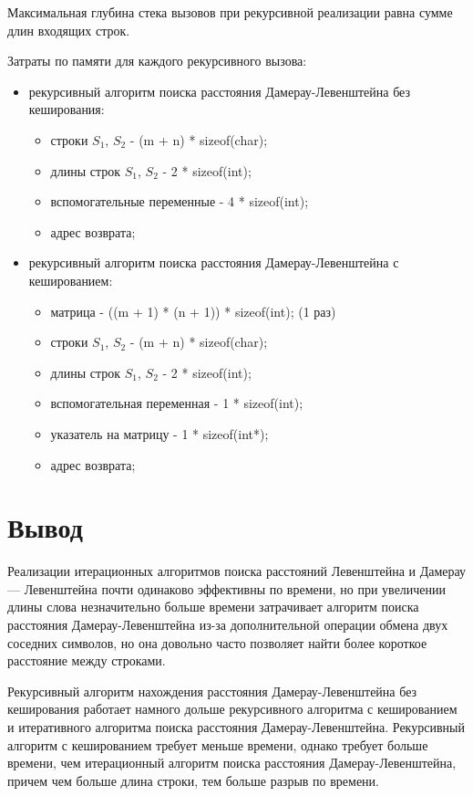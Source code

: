 Максимальная глубина стека вызовов при рекурсивной реализации равна сумме длин входящих строк.

Затраты по памяти для каждого рекурсивного вызова:
\begin{itemize}
	\item рекурсивный алгоритм поиска расстояния Дамерау-Левенштейна без кеширования:\begin{itemize}
		\item строки $S_1$, $S_2$ - (m + n) * sizeof(char);
		\item длины строк $S_1$, $S_2$ - 2 * sizeof(int);
		\item вспомогательные переменные -  4 * sizeof(int);
		\item адрес возврата;
	\end{itemize}
	\item рекурсивный алгоритм поиска расстояния Дамерау-Левенштейна с кешированием: \begin{itemize}
	    \item матрица - ((m + 1) * (n + 1)) * sizeof(int); (1 раз)
		\item строки $S_1$, $S_2$ - (m + n) * sizeof(char);
		\item длины строк $S_1$, $S_2$ - 2 * sizeof(int);
		\item вспомогательная переменная -  1 * sizeof(int);
		\item указатель на матрицу - 1 * sizeof(int*);
		\item адрес возврата;
	\end{itemize}
\end{itemize}

\section*{Вывод}

Реализации итерационных алгоритмов поиска расстояний Левенштейна и Дамерау — Левенштейна почти одинаково эффективны по времени, но при увеличении длины слова незначительно больше времени затрачивает алгоритм поиска расстояния Дамерау-Левенштейна из-за дополнительной операции обмена двух соседних символов, но она довольно часто позволяет найти более короткое расстояние между строками.

Рекурсивный алгоритм нахождения расстояния Дамерау-Левенштейна без кеширования работает намного дольше рекурсивного алгоритма с кешированием и итеративного алгоритма поиска расстояния Дамерау-Левенштейна. Рекурсивный алгоритм с кешированием требует меньше времени, однако требует больше времени, чем итерационный алгоритм поиска расстояния Дамерау-Левенштейна, причем чем больше длина строки, тем больше разрыв по времени. 

